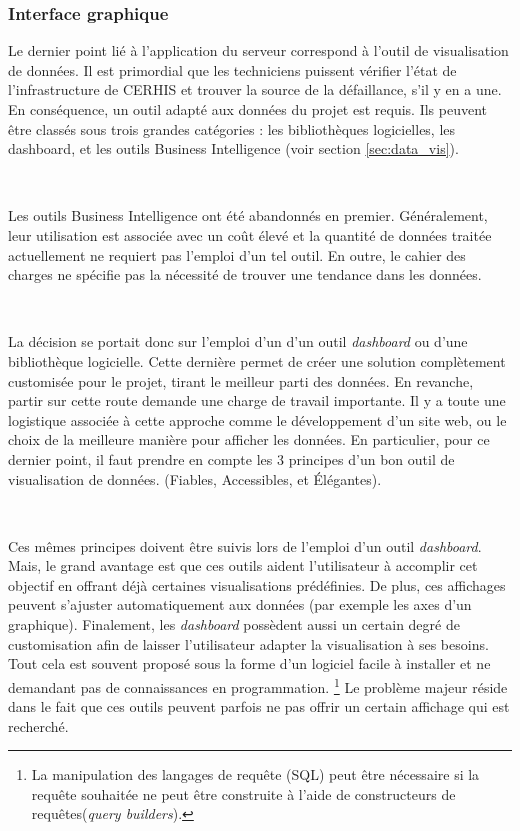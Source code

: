 \newpage

\subsubsection{Interface graphique}

\noindent
Le dernier point lié à l’application du serveur correspond à l’outil de visualisation de données. Il est primordial que les techniciens puissent vérifier l’état de l’infrastructure de CERHIS et trouver la source de la défaillance, s’il y en a une. En conséquence, un outil adapté aux données du projet est requis. Ils peuvent être classés sous trois grandes catégories : les bibliothèques logicielles, les dashboard, et les outils Business Intelligence (voir section \ref{sec:data_vis}).

~

\noindent
Les outils Business Intelligence ont été abandonnés en premier. Généralement, leur utilisation est associée avec un coût élevé et la quantité de données traitée actuellement ne requiert pas l'emploi d'un tel outil. En outre, le cahier des charges ne spécifie pas la nécessité de trouver une tendance dans les données.

~

\noindent
La décision se portait donc sur l'emploi d'un d’un outil \textit{dashboard} ou d'une bibliothèque logicielle. Cette dernière permet de créer une solution complètement customisée pour le projet, tirant le meilleur parti des données. En revanche, partir sur cette route demande une charge de travail importante. Il y a toute une logistique associée à cette approche comme le développement d'un site web, ou le choix de la meilleure manière pour afficher les données. En particulier, pour ce dernier point, il faut prendre en compte les 3 principes d’un bon outil de visualisation de données. (Fiables, Accessibles, et Élégantes).

~

\noindent
Ces mêmes principes doivent être suivis lors de l’emploi d’un outil \textit{dashboard}. Mais, le grand avantage est que ces outils aident l’utilisateur à accomplir cet objectif en offrant déjà certaines visualisations prédéfinies. De plus, ces affichages peuvent s’ajuster automatiquement aux données (par exemple les axes d’un graphique). Finalement, les \textit{dashboard} possèdent aussi un certain degré de customisation afin de laisser l’utilisateur adapter la visualisation à ses besoins. Tout cela est souvent proposé sous la forme d’un logiciel facile à installer et ne demandant pas de connaissances en programmation. \footnote{La manipulation des langages de requête (SQL) peut être nécessaire si la requête souhaitée ne peut être construite à l'aide de constructeurs de requêtes(\textit{query builders}).} Le problème majeur réside dans le fait que ces outils peuvent parfois ne pas offrir un certain affichage qui est recherché.


